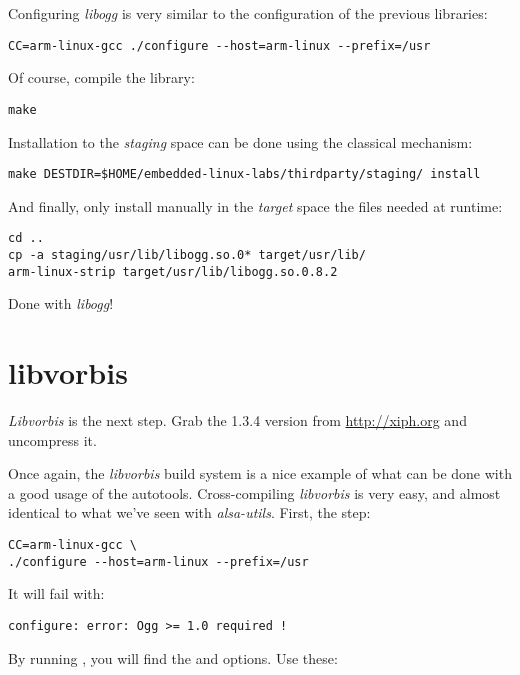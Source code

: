Configuring {\em libogg} is very similar to the configuration of the
previous libraries:

\begin{verbatim}
CC=arm-linux-gcc ./configure --host=arm-linux --prefix=/usr
\end{verbatim}

Of course, compile the library:

\begin{verbatim}
make
\end{verbatim}

Installation to the {\em staging} space can be done using the
classical  mechanism:

\begin{verbatim}
make DESTDIR=$HOME/embedded-linux-labs/thirdparty/staging/ install
\end{verbatim}

And finally, only install manually in the {\em target} space the files
needed at runtime:

\begin{verbatim}
cd ..
cp -a staging/usr/lib/libogg.so.0* target/usr/lib/
arm-linux-strip target/usr/lib/libogg.so.0.8.2
\end{verbatim}

Done with {\em libogg}!

\section{libvorbis}

{\em Libvorbis} is the next step. Grab the 1.3.4 version from
\url{http://xiph.org} and uncompress it.

Once again, the {\em libvorbis} build system is a nice example of what can
be done with a good usage of the autotools. Cross-compiling {\em
libvorbis} is very easy, and almost identical to what we've seen
with {\em alsa-utils}. First, the  step:

\begin{verbatim}
CC=arm-linux-gcc \
./configure --host=arm-linux --prefix=/usr
\end{verbatim}

It will fail with:

\begin{verbatim}
configure: error: Ogg >= 1.0 required !
\end{verbatim}

By running , you will find the
 and  options.
Use these:

